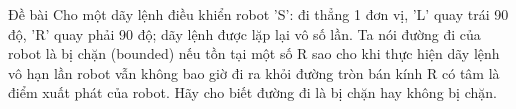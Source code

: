 Đề bài
Cho một dãy lệnh điều khiển robot 'S': đi thẳng 1 đơn vị, 'L' quay trái 90 độ, 'R' quay phải 90 độ; dãy lệnh được lặp lại vô số lần. Ta nói đường đi của robot là bị chặn (bounded) nếu tồn tại một số R sao cho khi thực hiện dãy lệnh vô hạn lần robot vẫn không bao giờ đi ra khỏi đường tròn bán kính R có tâm là điểm xuất phát của robot. Hãy cho biết đường đi là bị chặn hay không bị chặn.